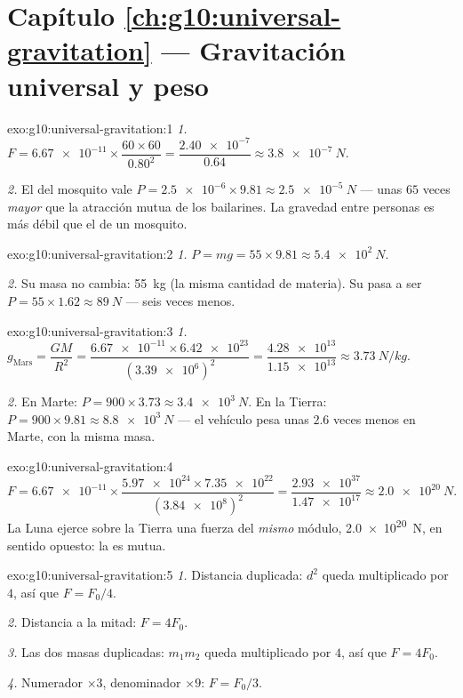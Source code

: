 \section*{Capítulo \ref{ch:g10:universal-gravitation} --- Gravitación universal y peso}

\begin{solution}{exo:g10:universal-gravitation:1}
\emph{1.} $F = \num{6.67e-11} \times \dfrac{60 \times 60}{0.80^2}
= \dfrac{\num{2.40e-7}}{0.64} \approx \qty{3.8e-7}{N}$.

\emph{2.} El  del mosquito vale
$P = \num{2.5e-6} \times 9.81 \approx \qty{2.5e-5}{N}$ --- unas $65$
veces \emph{mayor} que la atracción mutua de los bailarines. La gravedad
entre personas es más débil que el  de un mosquito.
\end{solution}

\begin{solution}{exo:g10:universal-gravitation:2}
\emph{1.} $P = mg = 55 \times 9.81 \approx \qty{5.4e2}{N}$.

\emph{2.} Su masa no cambia: \qty{55}{kg} (la misma cantidad de
materia). Su  pasa a ser $P = 55 \times 1.62 \approx \qty{89}{N}$
--- seis veces menos.
\end{solution}

\begin{solution}{exo:g10:universal-gravitation:3}
\emph{1.} $g_{\text{Mars}} = \dfrac{G M}{R^2}
= \dfrac{\num{6.67e-11} \times \num{6.42e23}}{(\num{3.39e6})^2}
= \dfrac{\num{4.28e13}}{\num{1.15e13}} \approx \qty{3.73}{N/kg}$.

\emph{2.} En Marte: $P = 900 \times 3.73 \approx \qty{3.4e3}{N}$. En la
Tierra: $P = 900 \times 9.81 \approx \qty{8.8e3}{N}$ --- el vehículo
pesa unas $2.6$ veces menos en Marte, con la misma masa.
\end{solution}

\begin{solution}{exo:g10:universal-gravitation:4}
\[
F = \num{6.67e-11} \times
\frac{\num{5.97e24} \times \num{7.35e22}}{(\num{3.84e8})^2}
= \frac{\num{2.93e37}}{\num{1.47e17}}
\approx \qty{2.0e20}{N}.
\]
La Luna ejerce sobre la Tierra una fuerza del \emph{mismo} módulo,
\qty{2.0e20}{N}, en sentido opuesto: la  es mutua.
\end{solution}

\begin{solution}{exo:g10:universal-gravitation:5}
\emph{1.} Distancia duplicada: $d^2$ queda multiplicado por $4$, así que
$F = F_0/4$.

\emph{2.} Distancia a la mitad: $F = 4F_0$.

\emph{3.} Las dos masas duplicadas: $m_1 m_2$ queda multiplicado por
$4$, así que $F = 4F_0$.

\emph{4.} Numerador $\times 3$, denominador $\times 9$: $F = F_0/3$.
\end{solution}

